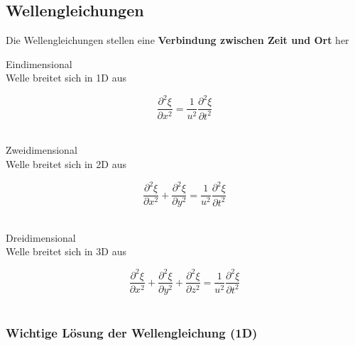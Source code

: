 \subsection{Wellengleichungen}
Die Wellengleichungen stellen eine \textbf{Verbindung zwischen Zeit und Ort} her \\

\vspace{0.5cm}


\begin{minipage}{0.45\linewidth}
Eindimensional \\
Welle breitet sich in 1D aus \\
\end{minipage}
\hfill
\begin{minipage}{0.48\linewidth}
$$\boxed{ \frac{\partial^2 \xi}{\partial x^2} = \frac{1}{u^2} \frac{\partial^2 \xi}{\partial t^2}  }$$  \\
\end{minipage}


\begin{minipage}{0.45\linewidth}
Zweidimensional \\
Welle breitet sich in 2D aus \\
\end{minipage}
\hfill
\begin{minipage}{0.48\linewidth}
$$\boxed{ \frac{\partial^2 \xi}{\partial x^2} + \frac{\partial^2 \xi}{\partial y^2} = \frac{1}{u^2} \frac{\partial^2 \xi}{\partial t^2}  }$$  \\
\end{minipage}




\begin{minipage}{0.45\linewidth}
Dreidimensional \\
Welle breitet sich in 3D aus \\
\end{minipage}
\hfill
\begin{minipage}{0.48\linewidth}
$$\boxed{ \frac{\partial^2 \xi}{\partial x^2} + \frac{\partial^2 \xi}{\partial y^2} + \frac{\partial^2 \xi}{\partial z^2} = \frac{1}{u^2} \frac{\partial^2 \xi}{\partial t^2}  }$$ \\
\end{minipage}



\subsubsection{Wichtige Lösung der Wellengleichung (1D)}

